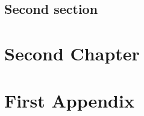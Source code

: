 \documentclass[12pt,twoside]{report}
\begin{document}
\section{Second section}


\chapter{Second Chapter}

\appendix

\chapter{First Appendix}




\end{document}
